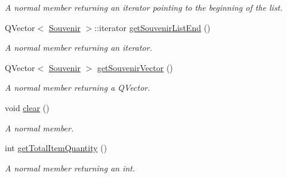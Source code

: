 \begin{DoxyCompactItemize}
\begin{DoxyCompactList}\small\item\em A normal member returning an iterator pointing to the beginning of the list. \end{DoxyCompactList}\item 
Q\+Vector$<$ \hyperlink{class_souvenir}{Souvenir} $>$\+::iterator \hyperlink{class_campus_ab9e5df7777d19980be0b431774e15063}{get\+Souvenir\+List\+End} ()
\begin{DoxyCompactList}\small\item\em A normal member returning an iterator. \end{DoxyCompactList}\item 
Q\+Vector$<$ \hyperlink{class_souvenir}{Souvenir} $>$ \hyperlink{class_campus_aae9e2dbb9a5188cbfbc30bb2a89195a3}{get\+Souvenir\+Vector} ()
\begin{DoxyCompactList}\small\item\em A normal member returning a Q\+Vector. \end{DoxyCompactList}\item 
void \hyperlink{class_campus_ac6d65337d2c655c92e476375ee4d355e}{clear} ()
\begin{DoxyCompactList}\small\item\em A normal member. \end{DoxyCompactList}\item 
int \hyperlink{class_campus_ac45d0728007e07587761b0fe28e3d959}{get\+Total\+Item\+Quantity} ()
\begin{DoxyCompactList}\small\item\em A normal member returning an int. \end{DoxyCompactList}\end{DoxyCompactItemize}
